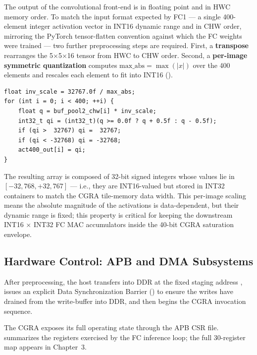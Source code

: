 The output of the convolutional front-end is in floating point and in
HWC memory order. To match the input format expected by FC1 ---
a single 400-element integer activation vector in INT16 dynamic range
and in CHW order, mirroring the PyTorch tensor-flatten convention
against which the FC weights were trained --- two further preprocessing
steps are required. First, a \textbf{transpose} rearranges the
5$\times$5$\times$16 tensor from HWC to CHW order. Second, a
\textbf{per-image symmetric quantization} computes
$\text{max\_abs} = \max(|x|)$ over the 400 elements and rescales each
element to fit into INT16 ().

\begin{lstlisting}[caption={Per-image quantization producing the FC1
input vector \code{act400}.},label={lst:quantize}]
float inv_scale = 32767.0f / max_abs;
for (int i = 0; i < 400; ++i) {
    float q = buf_pool2_chw[i] * inv_scale;
    int32_t qi = (int32_t)(q >= 0.0f ? q + 0.5f : q - 0.5f);
    if (qi >  32767) qi =  32767;
    if (qi < -32768) qi = -32768;
    act400_out[i] = qi;
}
\end{lstlisting}

The resulting  array is composed of 32-bit signed integers
whose values lie in $[-32{,}768, +32{,}767]$ --- i.e., they are
INT16-valued but stored in INT32 containers to match the CGRA
tile-memory data width. This per-image scaling means the absolute
magnitude of the activations is data-dependent, but their dynamic
range is fixed; this property is critical for keeping the downstream
INT16 $\times$ INT32 FC MAC accumulators inside the 40-bit CGRA
saturation envelope.

\subsection{Hardware Control: APB and DMA Subsystems}
\label{ssec:hwctrl}

After preprocessing, the host transfers  into DDR at
the fixed staging address , issues an explicit Data
Synchronization Barrier
() to ensure the writes have
drained from the write-buffer into DDR, and then begins the CGRA
invocation sequence.

The CGRA exposes its full operating state through the APB CSR file.
 summarizes the registers exercised by the FC inference
loop; the full 30-register map appears in Chapter~3.

